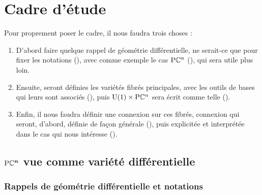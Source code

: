 \section{Cadre d'étude}\label{sec:cadre_geodiff}

Pour proprement poser le cadre, il nous faudra trois choses :
\begin{enumerate}
	
	\item D'abord faire quelque rappel de géométrie différentielle, ne serait-ce que pour fixer les notations (), avec comme exemple le cas $\text{\normalfont P}\mathbb{C}^{n}$ (), qui sera utile plus loin. 
	
	\item Ensuite, seront définies les variétés fibrés principales, avec les outils de bases qui leurs sont associés (), puis $\text{\normalfont U}(1)\times \text{\normalfont P}\mathbb{C}^{n}$ sera écrit comme telle ().
	
	\item Enfin, il nous faudra définir une connexion sur ces fibrés, connexion qui seront, d'abord, définie de façon générale (), puis explicitée et interprétée dans le cas qui nous intéresse ().
	
\end{enumerate}

\subsection{$\boldsymbol{\text{\normalfont P}\mathbb{C}^{n}}$ vue comme variété différentielle} \label{subsec:construc_PC^n}

\subsubsection{Rappels de géométrie différentielle et notations}\label{subsec:rappel2geo_diff}

